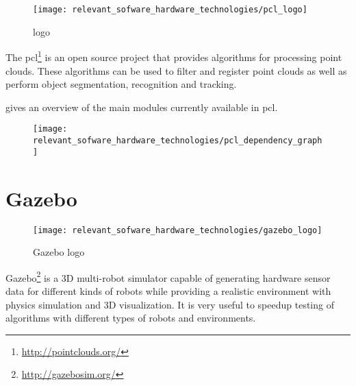 \section{}

\begin{wrapfigure}{r}{0.25\textwidth}
	\centering
	\texttt{[image: relevant\_sofware\_hardware\_technologies/pcl\_logo]}
	\caption{ logo}
	\label{fig:relevant-sofware-hardware-technologies_pcl-logo}
\end{wrapfigure}

The \gls{pcl}\footnote{\url{http://pointclouds.org/}} \cite{Rusu2011} is an open source project that provides algorithms for processing point clouds. These algorithms can be used to filter and register point clouds as well as perform object segmentation, recognition and tracking.

 gives an overview of the main modules currently available in \gls{pcl}.

\begin{figure}[H]
	\centering
	\texttt{[image: relevant\_sofware\_hardware\_technologies/pcl\_dependency\_graph]}
	\caption[]{\protect\footnotemark}
	\label{fig:relevant-sofware-hardware-technologies_pcl-dependency-graph}
\end{figure}

\clearpage



\section{Gazebo}

\begin{wrapfigure}{r}{0.25\textwidth}
	\centering
	\texttt{[image: relevant\_sofware\_hardware\_technologies/gazebo\_logo]}
	\caption{Gazebo logo}
	\label{fig:relevant-sofware-hardware-technologies_gazebo-logo}
\end{wrapfigure}


Gazebo\footnote{\url{http://gazebosim.org/}} is a 3D multi-robot simulator capable of generating hardware sensor data for different kinds of robots while providing a realistic environment with physics simulation and 3D visualization. It is very useful to speedup testing of algorithms with different types of robots and environments.


